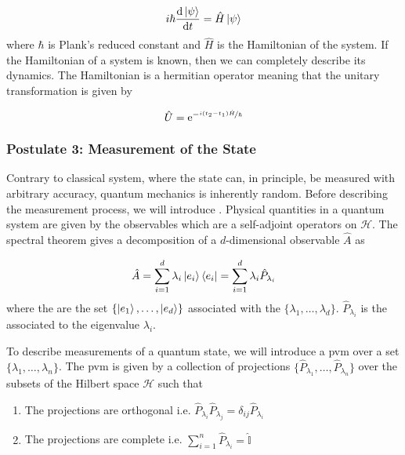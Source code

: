 \begin{equation}
	i \hbar \frac{\mathrm{d}\ket{\psi}}{\mathrm{d}t} = \hat{H}\ket{\psi}
\end{equation}
where $\hbar$ is Plank's reduced constant and $\hat{H}$ is the Hamiltonian of the system. If the Hamiltonian of a system is known, then we can completely describe its dynamics. The Hamiltonian is a hermitian operator meaning that the unitary transformation is given by

\begin{equation}
	\hat{U} = \mathrm{e}^{-\nicefrac{i(t_2 - t_1)\hat{H}}{\hbar}}
\end{equation}

\subsubsection*{Postulate 3: Measurement of the State}

Contrary to classical system, where the state can, in principle, be measured with arbitrary accuracy, quantum mechanics is inherently random. Before describing the measurement process, we will introduce . Physical quantities in a quantum system are given by the observables which are a self-adjoint operators on $\mathcal{H}$. The spectral theorem gives a decomposition of a $d$-dimensional observable $\hat{A}$ as 

\begin{equation}
	\hat{A} = \sum_{i=1}^d \lambda_i \ket{e_i}\bra{e_i} = \sum_{i=1}^d \lambda_i \hat{P}_{\lambda_i}
\end{equation}
where the  are the set $\{\ket{e_1},\ldots ,\ket{e_d}\}$ associated with the  $\{\lambda_1,\ldots ,\lambda_d\}$. $\hat{P}_{\lambda_i}$ is the  associated to the eigenvalue $\lambda_i$.

To describe measurements of a quantum state, we will introduce a \ac{pvm} over a set $\{\lambda_1, \ldots, \lambda_n\}$. The \ac{pvm} is given by a collection of projections $\{\hat{P}_{\lambda_1},\ldots,\hat{P}_{\lambda_n}\}$ over the subsets of the Hilbert space $\mathcal{H}$ such that

\begin{enumerate}
	\item The projections are orthogonal i.e. $\hat{P}_{\lambda_i}\hat{P}_{\lambda_j} = \delta_{ij}\hat{P}_{\lambda_i}$
	\item The projections are complete i.e. $\sum_{i=1}^n \hat{P}_{\lambda_i} = \hat{\mathbb{I}}$
\end{enumerate}

